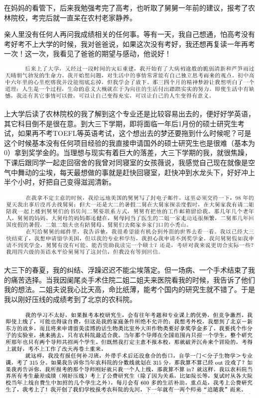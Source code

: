\documentclass[9pt, b5paper]{article}
\begin{document}
在妈妈的看管下，后来我勉强考完了高考，也听取了舅舅一年前的建议，报考了农林院校，考完后就一直呆在农村老家静养。

亲人里没有任何人再问我成绩相关的任何事。等有一天，我自己想通，怕高考没有考好考不上大学的时候，我对爸爸说，如果这次没有考好，我还想再复读一年再考一次！这一次，我看见了爸爸的期望与感动，他说好！

\begin{center}
\includegraphics[width=.9\linewidth]{./pic/p1p23.png}
\end{center}

上大学后读了农林院校的我了解到这个专业还是比较容易出去的，便好好学英语，其它科目倒不是很在意。到大三下学期，即将面临一年后1月份的硕士研究生考试，如果再不考TOEFL等英语考试，这个想出去的梦还要拖到什么时候呢？可是这个时候基本没有任何项目经验的我直接申请国外的硕士研究生也是很难（基本为0）拿到奖学金的。当理想与现实有着巨大的落差，大三下学期的我，就很焦躁，下课后跟同学一起走回宿舍的我曾对同寝室的女孩薇说，我感觉自己现在就像是空气中舞动的尘埃，每天最想做的事就是赶快回寝室，赶快冲到水龙头下，好好冲上半个小时，好把自己变得滋润清新。

\begin{center}
\includegraphics[width=.9\linewidth]{./pic/p1p25.png}
\end{center}

大三下的春夏，我的纠结、浮躁迟迟不能尘埃落定。但一场病、一个手术结束了我的痛苦选择。当我因阑尾炎手术住院二姐二姐夫来医院看我的时候，我告诉了他们我的想法。二姐夫说我心比天高，命比纸薄，能考个国内的研究生就不错了。于是我以刚好压线的成绩考到了北京的农科院。

\begin{center}
\includegraphics[width=.9\linewidth]{./pic/p1p26.png}
\end{center}
\end{document}
